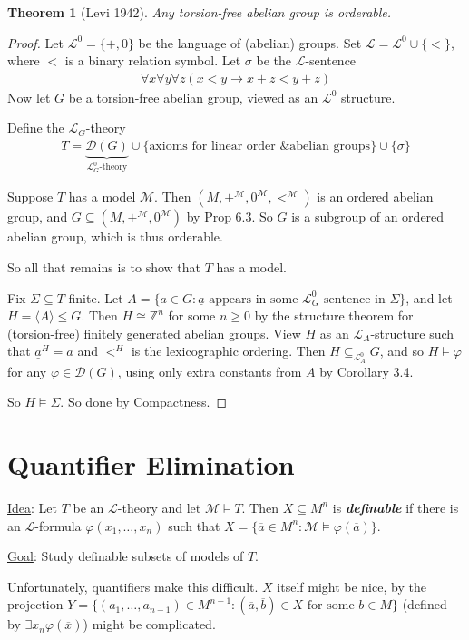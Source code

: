 \documentclass[]{article}
\theoremstyle{custhm}
\newtheorem{theorem}{Theorem}[section]
\theoremstyle{cusdef}
\theoremstyle{custhm}
\theoremstyle{custhm}
\theoremstyle{custhm}
\theoremstyle{ex}
\theoremstyle{custhm}
\theoremstyle{cusdef}
\theoremstyle{remark}
\theoremstyle{remark}
\newcommand{\Z}{\mathbb{Z}}
\newcommand{\ra}{\rightarrow}
\newcommand{\undf}[1]{\textit{\textbf{#1}}}
\renewcommand{\L}{\mathcal{L}}
\newcommand{\M}{\mathcal{M}}
\renewcommand{\phi}{\varphi}
\renewcommand{\bar}{\overline}
\newcommand{\D}{\mathcal{D}}
\renewcommand{\subset}{\subseteq}
\begin{document}
\begin{theorem}[Levi 1942]
Any torsion-free abelian group is orderable.
\end{theorem}
\begin{proof}
Let $\L^0 = \{+,0\}$ be the language of (abelian) groups. Set $\L = \L^0 \cup\{<\}$, where $<$ is a binary relation symbol. Let $\sigma$ be the $\L$-sentence
\begin{align*}
\forall x \forall y\forall z ( x< y \ra x + z < y + z)
\end{align*}
Now let $G$ be a torsion-free abelian group, viewed as an $\L^0$ structure.

Define the $\L_G$-theory
\begin{align*}
T = \underbrace{\D(G)}_{\L_G^0\textrm{-theory}}\cup\{\textrm{axioms for linear order \& abelian groups}\}\cup\{\sigma\}
\end{align*}

Suppose $T$ has a model $\M$. Then $(M,+^\M,0^\M,<^\M)$ is an ordered abelian group, and $G\subset (M,+^\M,0^\M)$ by Prop 6.3. So $G$ is a subgroup of an ordered abelian group, which is thus orderable.

So all that remains is to show that $T$ has a model.

Fix $\Sigma \subset T$ finite. Let $A = \{a\in G: \underline{a}\textrm{ appears in some }\L_G^0\textrm{-sentence in }\Sigma\}$, and let $H = \langle A\rangle \le G$. Then $H\cong \Z^n$ for some $n\ge 0$ by the structure theorem for (torsion-free) finitely generated abelian groups. View $H$ as an $\L_A$-structure such that $\underline{a}^H = a$ and $<^H$ is the lexicographic ordering. Then $H\subset_{\L_A^0} G$, and so $H\models \phi$ for any $\phi \in \D(G)$, using only extra constants from $A$ by Corollary 3.4.

So $H\models \Sigma$. So done by Compactness.
\end{proof}


\section*{Quantifier Elimination}

\underline{Idea}: Let $T$ be an $\L$-theory and let $\M\models T$. Then $X\subset M^n$ is \undf{definable} if there is an $\L$-formula $\phi(x_1,\dots,x_n)$ such that $X = \{\bar{a}\in M^n : \M\models \phi(\bar{a})\}$.

\underline{Goal}: Study definable subsets of models of $T$.

Unfortunately, quantifiers make this difficult. $X$ itself might be nice, by the projection $Y = \{(a_1,\dots,a_{n-1})\in M^{n-1}:(\bar{a},\bar{b})\in X\textrm{ for some }b\in M\}$ (defined by $\exists x_n \phi(\bar{x})$) might be complicated.
\end{document}
